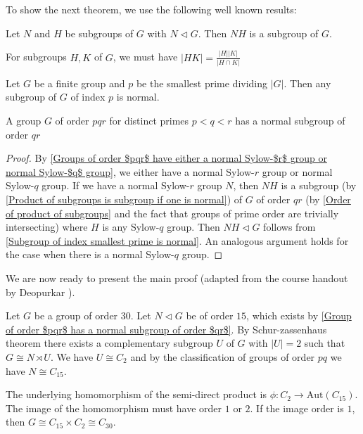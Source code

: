 \documentclass[a4paper,11pt, titlepage]{article}
\theoremstyle{remark}
\begin{document}
To show the next theorem, we use the following well known results:
\begin{lemma}\label{Product of subgroups is subgroup if one is normal}
    Let $N$ and $H$ be subgroups of $G$ with $N \lhd G$. Then $NH$ is a subgroup of $G$.
\end{lemma}
\begin{lemma}\label{Order of product of subgroups}
    For subgroups $H, K$ of $G$, we must have $|HK| = \frac{|H||K|}{|H \cap K|}$
\end{lemma}
\begin{lemma}\label{Subgroup of index smallest prime is normal}
    Let $G$ be a finite group and $p$ be the smallest prime dividing $|G|$. Then any subgroup of $G$ of index $p$ is normal.
\end{lemma}

\begin{theorem}\label{Group of order $pqr$ has a normal subgroup of order $qr$}
    A group $G$ of order $pqr$ for distinct primes $p < q < r$ has a normal subgroup of order $qr$
\end{theorem}
\begin{proof}
    By \ref{Groups of order $pqr$ have either a normal Sylow-$r$ group or normal Sylow-$q$ group}, we either have a normal Sylow-$r$ group or normal Sylow-$q$ group. If we have a normal Sylow-$r$ group $N$, then $NH$ is a subgroup (by \ref{Product of subgroups is subgroup if one is normal}) of $G$ of order $qr$ (by \ref{Order of product of subgroups} and the fact that groups of prime order are trivially intersecting) where $H$ is any Sylow-$q$ group. Then $NH \lhd G$ follows from \ref{Subgroup of index smallest prime is normal}. An analogous argument holds for the case when there is a normal Sylow-$q$ group.
\end{proof}

We are now ready to present the main proof (adapted from the course handout by Deopurkar \cite{deopurkar_modern_2013}).

Let $G$ be a group of order $30$. Let $N \lhd G$ be of order $15$, which exists by \ref{Group of order $pqr$ has a normal subgroup of order $qr$}.
By Schur-zassenhaus theorem there exists a complementary subgroup $U$ of $G$ with $|U| = 2$ such that $G \cong N \rtimes U$. We have $U \cong C_2$ and by the classification of groups of order $pq$ we have $N \cong C_{15}$. 

The underlying homomorphism of the semi-direct product is $\phi : C_2 \rightarrow \text{Aut}(C_{15})$. The image of the homomorphism must have order $1$ or $2$. If the image order is $1$, then $G \cong C_{15} \times C_2 \cong C_{30}$. 
\end{document}
